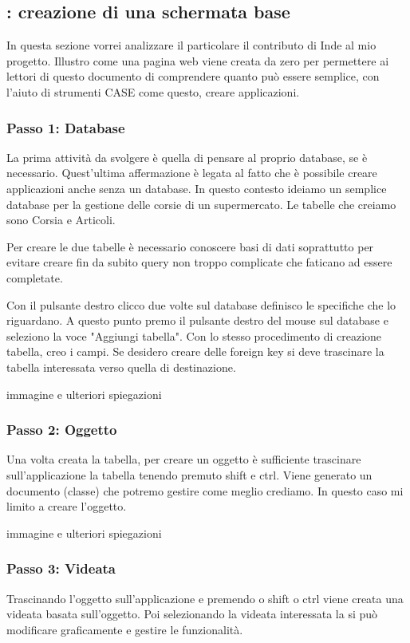 \subsection{\inde: creazione di una schermata base}
In questa sezione vorrei analizzare il particolare il contributo di Inde al mio progetto. Illustro come una pagina web viene creata da zero per permettere ai lettori di questo documento di comprendere quanto può essere semplice, con l'aiuto di strumenti CASE come questo, creare applicazioni.

\subsubsection{Passo 1: Database}
La prima attività da svolgere è quella di pensare al proprio database, se è necessario. Quest'ultima affermazione è legata al fatto che è possibile creare applicazioni anche senza un database.
In questo contesto ideiamo un semplice database per la gestione delle corsie di un supermercato. Le tabelle che creiamo sono Corsia e Articoli.

Per creare le due tabelle è necessario conoscere basi di dati soprattutto per evitare creare fin da subito query non troppo complicate che faticano ad essere completate. 

Con il pulsante destro clicco due volte sul database definisco le specifiche che lo riguardano. A questo punto premo il pulsante destro del mouse sul database e seleziono la voce "Aggiungi tabella". Con lo stesso procedimento di creazione tabella, creo i campi.
Se desidero creare delle foreign key si deve trascinare la tabella interessata verso quella di destinazione.  

\todo immagine e ulteriori spiegazioni

\subsubsection{Passo 2: Oggetto}
Una volta creata la tabella, per creare un oggetto è sufficiente trascinare sull'applicazione la tabella tenendo premuto shift e ctrl. Viene generato un documento (classe) che potremo gestire come meglio crediamo. In questo caso mi limito a creare l'oggetto.


\todo immagine e ulteriori spiegazioni

\subsubsection{Passo 3: Videata}
Trascinando l'oggetto sull'applicazione e premendo o shift o ctrl viene creata una videata basata sull'oggetto. Poi selezionando la videata interessata la si può modificare graficamente e gestire le funzionalità.


